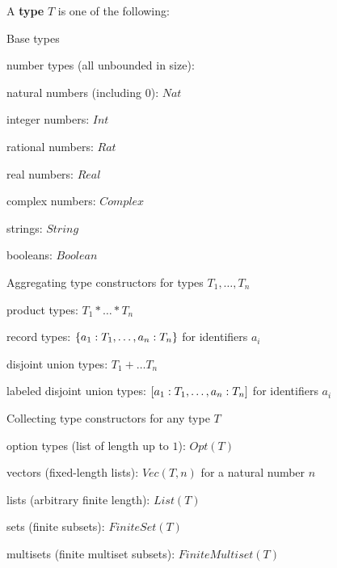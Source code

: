 A \textbf{type} $T$ is one of the following:

\begin{itemize}
\item Base types
\begin{compactitem}
 \item number types (all unbounded in size):
  \begin{compactitem}
   \item natural numbers (including $0$): $Nat$
   \item integer numbers: $Int$
   \item rational numbers: $Rat$
   \item real numbers: $Real$ 
   \item complex numbers: $Complex$
  \end{compactitem}
 \item strings: $String$
 \item booleans: $Boolean$
\end{compactitem}
\item Aggregating type constructors for types $T_1,\ldots,T_n$
\begin{compactitem}
 \item product types: $T_1*\ldots * T_n$
 \item record types: $\record{a_1: T_1, \ldots, a_n:T_n}$ for identifiers $a_i$
 \item disjoint union types: $T_1+\ldots T_n$ 
 \item labeled disjoint union types: $\union{a_1:T_1,\ldots,a_n: T_n}$ for identifiers $a_i$ 
\end{compactitem}
\item Collecting type constructors for any type $T$
\begin{compactitem}
 \item option types (list of length up to $1$): $Opt(T)$
 \item vectors (fixed-length lists): $Vec(T,n)$ for a natural number $n$
 \item lists (arbitrary finite length): $List(T)$
 \item sets (finite subsets): $FiniteSet(T)$
 \item multisets (finite multiset subsets): $FiniteMultiset(T)$

\end{compactitem}
\end{itemize}
